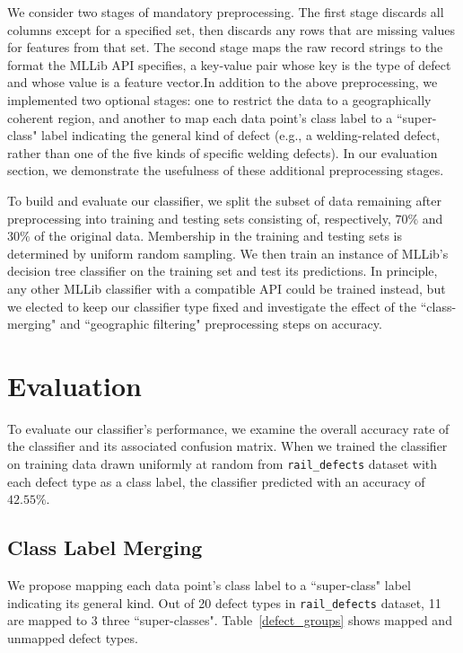 \documentclass{sig-alternate-05-2015}
\begin{document}
We consider two stages of mandatory preprocessing. The first stage discards all columns except 
for a specified set, then discards any rows that are missing values for features from that set. 
The second stage maps the raw record strings to the format the MLLib API specifies, a key-value 
pair whose key is the type of defect and whose value is a feature vector.In addition to the
above preprocessing, we implemented two optional stages: one to restrict the data to a 
geographically coherent region, and another to map each data point's class label to a ``super-
class" label indicating the general kind of defect (e.g., a welding-related defect, rather than 
one of the five kinds of specific welding defects). In our evaluation section, we demonstrate
the usefulness of these additional preprocessing stages. 

To build and evaluate our classifier, we split the subset of data remaining after preprocessing into
training and testing sets consisting of, respectively, $70\%$ and $30\%$ of the original data. 
Membership in the training and testing sets is determined by uniform random sampling. We then 
train an instance of MLLib's decision tree classifier on the training set and test its predictions.
In principle, any other MLLib classifier with a compatible API could be trained instead, but we 
elected to keep our classifier type fixed and investigate the effect of the ``class-merging" and 
``geographic filtering" preprocessing steps on accuracy. 



\section{Evaluation}

To evaluate our classifier's performance, we examine the overall accuracy rate of the classifier
and its associated confusion matrix. When we trained the classifier on training data drawn uniformly at random from \texttt{rail\_defects} dataset with each defect type as a class label, the classifier predicted with an accuracy of $42.55\%$. 

\subsection{Class Label Merging}
We propose mapping each data point's class label to a ``super-class" label indicating its general kind. Out of 20 defect types in \texttt{rail\_defects} dataset, 11 are mapped to 3 three ``super-classes". Table~\ref{defect_groups} shows mapped and unmapped defect types.
\end{document}
